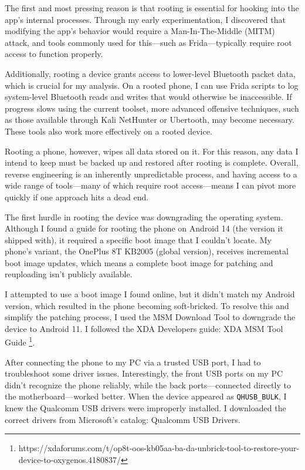 The first and most pressing reason is that rooting is essential for hooking into the app's internal processes. Through my early experimentation, I discovered that modifying the app’s behavior would require a Man-In-The-Middle (MITM) attack, and tools commonly used for this—such as Frida—typically require root access to function properly.

Additionally, rooting a device grants access to lower-level Bluetooth packet data, which is crucial for my analysis. On a rooted phone, I can use Frida scripts to log system-level Bluetooth reads and writes that would otherwise be inaccessible. If progress slows using the current toolset, more advanced offensive techniques, such as those available through Kali NetHunter or Ubertooth, may become necessary. These tools also work more effectively on a rooted device.

Rooting a phone, however, wipes all data stored on it. For this reason, any data I intend to keep must be backed up and restored after rooting is complete. Overall, reverse engineering is an inherently unpredictable process, and having access to a wide range of tools—many of which require root access—means I can pivot more quickly if one approach hits a dead end.

The first hurdle in rooting the device was downgrading the operating system. Although I found a guide for rooting the phone on Android 14 (the version it shipped with), it required a specific boot image that I couldn’t locate. My phone’s variant, the OnePlus 8T KB2005 (global version), receives incremental boot image updates, which means a complete boot image for patching and reuploading isn't publicly available.

I attempted to use a boot image I found online, but it didn’t match my Android version, which resulted in the phone becoming soft-bricked. To resolve this and simplify the patching process, I used the MSM Download Tool to downgrade the device to Android 11. I followed the XDA Developers guide: XDA MSM Tool Guide \footnote{https://xdaforums.com/t/op8t-oos-kb05aa-ba-da-unbrick-tool-to-restore-your-device-to-oxygenos.4180837/}.

After connecting the phone to my PC via a trusted USB port, I had to troubleshoot some driver issues. Interestingly, the front USB ports on my PC didn’t recognize the phone reliably, while the back ports—connected directly to the motherboard—worked better. When the device appeared as \texttt{QHUSB\_BULK}, I knew the Qualcomm USB drivers were improperly installed. I downloaded the correct drivers from Microsoft’s catalog: Qualcomm USB Drivers.

